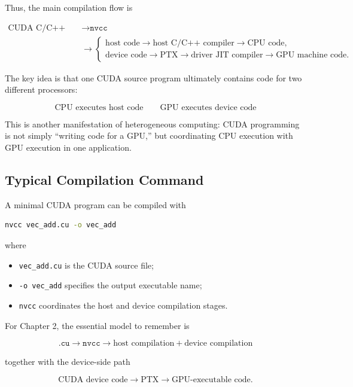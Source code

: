 \documentclass[11pt,a4paper]{article}
\begin{document}
Thus, the main compilation flow is

\[
\begin{aligned}
\text{CUDA C/C++ source (.cu)}
&\rightarrow
\texttt{nvcc}
\\[3pt]
&\rightarrow
\begin{cases}
\text{host code}
\rightarrow
\text{host C/C++ compiler}
\rightarrow
\text{CPU code},
\\[4pt]
\text{device code}
\rightarrow
\text{PTX}
\rightarrow
\text{driver JIT compiler}
\rightarrow
\text{GPU machine code}.
\end{cases}
\end{aligned}
\]

The key idea is that one CUDA source program ultimately contains code for two different processors:

\[
\boxed{
\text{CPU executes host code}
\qquad
\text{GPU executes device code}
}
\]

This is another manifestation of heterogeneous computing: CUDA programming is not simply ``writing code for a GPU,'' but coordinating CPU execution with GPU execution in one application.

\subsection{Typical Compilation Command}

A minimal CUDA program can be compiled with

\begin{lstlisting}[language=bash]
nvcc vec_add.cu -o vec_add
\end{lstlisting}

where

\begin{itemize}
    \item \texttt{vec\_add.cu} is the CUDA source file;
    \item \texttt{-o vec\_add} specifies the output executable name;
    \item \texttt{nvcc} coordinates the host and device compilation stages.
\end{itemize}

For Chapter 2, the essential model to remember is

\[
\boxed{
\texttt{.cu}
\rightarrow
\texttt{nvcc}
\rightarrow
\text{host compilation}
+
\text{device compilation}
}
\]

together with the device-side path

\[
\boxed{
\text{CUDA device code}
\rightarrow
\text{PTX}
\rightarrow
\text{GPU-executable code}.
}
\]
\end{document}
